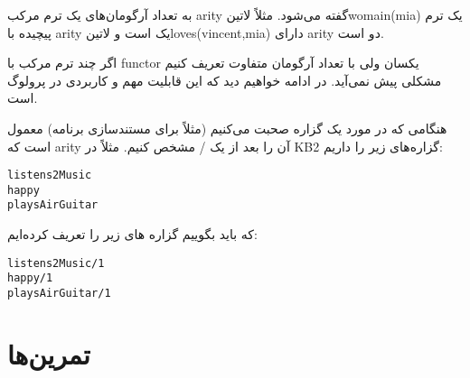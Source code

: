 به تعداد آرگومان‌های یک ترم مرکب arity گفته می‌شود. مثلاً ‌لاتین{womain(mia)} یک ترم پیچیده با arity یک است و ‌لاتین{loves(vincent,mia)} دارای arity دو است.

اگر چند ترم مرکب با functor یکسان ولی با تعداد آرگومان متفاوت تعریف کنیم مشکلی پیش نمی‌آید. در ادامه خواهیم دید که این قابلیت مهم و کاربردی در پرولوگ است.

هنگامی که در مورد یک گزاره صحبت می‌کنیم (مثلاً برای مستندسازی برنامه) معمول است که arity آن را بعد از یک / مشخص کنیم. مثلاً در KB2 گزاره‌های زیر را داریم:

\begin{latin}
\begin{lstlisting}
listens2Music 
happy 
playsAirGuitar
\end{lstlisting}
\end{latin}

که باید بگوییم گزاره های زیر را تعریف کرده‌ایم:

\begin{latin}
\begin{lstlisting}
listens2Music/1 
happy/1
playsAirGuitar/1
\end{lstlisting}
\end{latin}

\section{تمرین‌ها}
